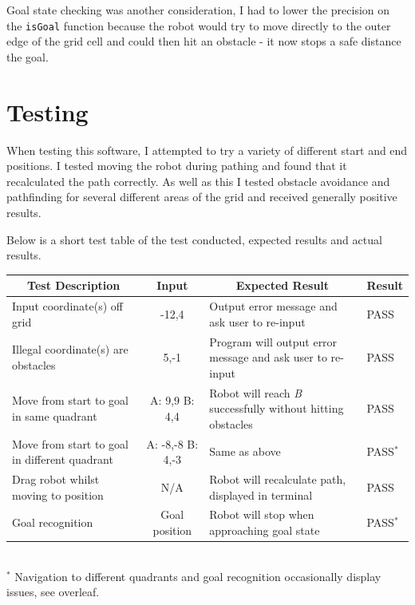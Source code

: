 \documentclass[a4paper,12pt]{article}
\begin{document}
Goal state checking was another consideration, I had to lower the precision on the \texttt{isGoal} function because the robot would try to move directly to the outer edge of the grid cell and could then hit an obstacle - it now stops a safe distance the goal.

\section{Testing}
When testing this software, I attempted to try a variety of different start and end positions. I tested moving the robot during pathing and found that it recalculated the path correctly. As well as this I tested obstacle avoidance and pathfinding for several different areas of the grid and received generally positive results.

Below is a short test table of the test conducted, expected results and actual results.
\begin{table}[ht!]
\scriptsize
    \begin{tabular}{|l|c|l|l|}
        \hline
        \multicolumn{1}{|c|}{\textbf{Test Description}} & \multicolumn{1}{c|}{\textbf{Input}}& \multicolumn{1}{c|}{\textbf{Expected Result}} & \multicolumn{1}{c|}{\textbf{Result}} \\
        \hline
        Input coordinate(s) off grid & -12,4 & Output error message and ask user to re-input & PASS\\
        \hline
        Illegal coordinate(s) are obstacles & 5,-1 & Program will output error message and ask user to re-input & PASS\\
        \hline
        Move from start to goal in same quadrant & A: 9,9 B: 4,4 & Robot will reach \textit{B} successfully without hitting obstacles & PASS\\
        \hline
        Move from start to goal in different quadrant & A: -8,-8 B: 4,-3 & Same as above & PASS$^*$\\
        \hline
        Drag robot whilst moving to position & N/A & Robot will recalculate path, displayed in terminal & PASS\\
        \hline
        Goal recognition & Goal position & Robot will stop when approaching goal state & PASS$^*$\\
        \hline
    \end{tabular}
    \\
$^*$ Navigation to different quadrants and goal recognition occasionally display issues, see overleaf.
\normalsize
\end{table}
\end{document}
